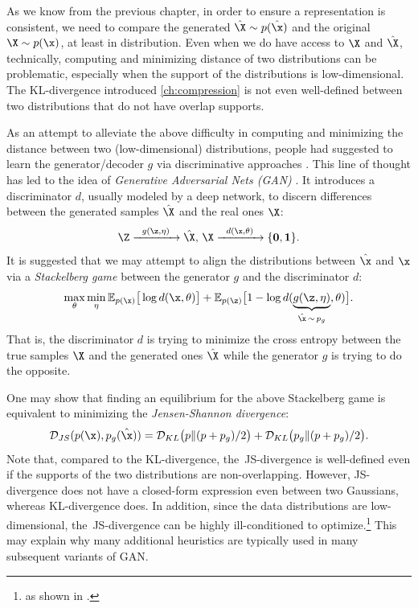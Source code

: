 \documentclass[../../book-main.tex]{subfiles}
\begin{document}
As we know from the previous chapter, in order to ensure a representation is consistent, we need to compare the generated $\hat \X \sim p(\hat\x)$ and the original $\X \sim p(\x)$, at least in distribution. Even when we do have access to $\X$ and $\hat \X$, technically, computing and minimizing distance of two distributions can be problematic, especially when the support of the distributions is low-dimensional. The KL-divergence introduced \ref{ch:compression} is not even well-defined between two distributions that do not have overlap supports. 

As an attempt to alleviate the above difficulty in computing and minimizing the distance between two (low-dimensional)  distributions, people had suggested to learn the generator/decoder $g$ via discriminative approaches \cite{Tu-2007}. This line of thought has led to  the idea of {\em Generative Adversarial Nets (GAN)} \cite{goodfellow2014generative}. It introduces a discriminator $d$, usually modeled by a deep network, to discern differences between the generated samples $\hat \X$ and the real ones $\X$:
\begin{equation}
 \Z \xrightarrow{\hspace{2mm} g(\z,\eta) \hspace{2mm}} \hat \X, \, \X \xrightarrow{\hspace{2mm} d(\x, \theta)\hspace{2mm}} \{\mathbf 0, \mathbf 1\}.
 \label{eqn:GAN}
\end{equation}
It is suggested that we may attempt to align the distributions between $\hat \x$ and $\x$ via a {\em Stackelberg game} between the generator $g$ and the discriminator $d$:
\begin{equation}
\max_{\theta}\min_{\eta} \mathbb{E}_{p({\x})}\big[\log d(\x,\theta)\big] + \mathbb{E}_{p({\z})}\big[1 - \log d(\underbrace{g(\z,\eta)}_{\hat \x \,\sim\, p_g},\theta)\big].
\end{equation}
That is, the discriminator $d$ is trying to minimize the cross entropy between the true samples $\X$ and the generated ones $\hat \X$ while the generator $g$ is trying to do  the opposite. 

One may show that finding an equilibrium for the above Stackelberg game is equivalent to minimizing the {\em Jensen-Shannon divergence}:
\begin{equation}
    \mathcal{D}_{JS}(p(\x), p_g(\hat \x)) = \mathcal{D}_{KL}\big(p \| (p + p_g)/{2}\big) + \mathcal{D}_{KL}\big(p_g \| (p + p_g)/{2}\big).
\end{equation}
Note that, compared to the KL-divergence, the~JS-divergence is well-defined even if the supports of the two distributions are non-overlapping. However, JS-divergence does not have a closed-form expression even between two Gaussians, whereas KL-divergence does. In addition, since the data distributions are low-dimensional, the~JS-divergence can be highly ill-conditioned to optimize.\footnote{as shown in \cite{arjovsky2017wasserstein}.} This may explain why many additional heuristics are typically used in many subsequent variants of GAN. 
\end{document}
